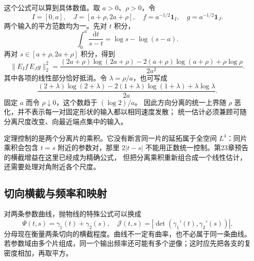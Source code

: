 这个公式可以算到具体数值。取 \(a>0\)、\(\rho>0\)，令
\[
 I=[0,a],\quad J=[a+\rho,2a+\rho],\quad
 f=a^{-1/2}\mathbf1_I,\quad g=a^{-1/2}\mathbf1_J.
\]
两个输入的平方范数均为一。先对 \(t\) 积分，
\[
 \int_0^a\frac{\mathrm dt}{s-t}
 =\log s-\log(s-a).
\]
再对 \(s\in[a+\rho,2a+\rho]\) 积分，得到
\[
 \|E_If\,E_Jg\|_2^2
 =\frac{(2a+\rho)\log(2a+\rho)
 -2(a+\rho)\log(a+\rho)+\rho\log\rho}{2a^2}.
\]
其中各项的线性部分恰好抵消。令 \(\lambda=\rho/a\)，也可写成
\[
 \frac{(2+\lambda)\log(2+\lambda)
 -2(1+\lambda)\log(1+\lambda)+\lambda\log\lambda}{2a}.
\]
固定 \(a\) 而令 \(\rho\downarrow0\)，这个数趋于 \((\log2)/a\)。
因此方向分离的统一上界随 \(\rho\) 恶化，并不表示每一对固定形状的输入都以相同速度发散；
统一估计必须兼顾可随分离尺度改变、向最近端点集中的输入。

\ProseParagraphBreak
定理控制的是两个分离片的乘积。它没有断言同一片的延拓属于全空间
\(L^4\)：同片乘积会包含 \(t=s\) 附近的参数对，那里
\(2|t-s|\) 不能用正数统一控制。第23章预告的横截增益在这里已经成为精确公式，
但把分离乘积重新组合成一个线性估计，还需要处理对角附近各个尺度。

\subsection{切向横截与频率和映射}
\label{b2:subsec:250303}

对两条参数曲线，抛物线的特殊公式可以换成
\[
 \Psi(t,s)=\gamma_1(t)+\gamma_2(s),\quad
 \mathcal J(t,s)=
 |\det(\gamma_1'(t),\gamma_2'(s))|.
\]
分母现在衡量两条切向的横截程度。曲线不一定有曲率，也不必属于同一条曲线。
若参数域由多个片组成，同一个输出频率还可能有多个逆像；这时应先把各支的复密度相加，再取平方。


